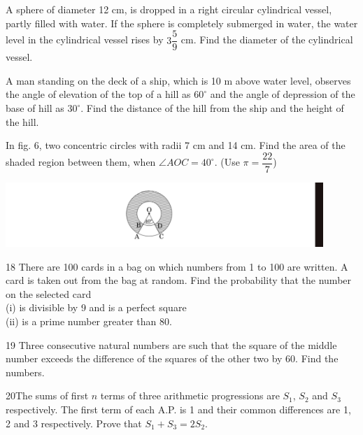 \documentclass[a4paper,12pt]{article}
\begin{document}
\begin{enumerate}
    \item A sphere of diameter 12 cm, is dropped in a right circular cylindrical vessel, partly filled with water. If the sphere is completely submerged in water, the water level in the cylindrical vessel rises by $3\dfrac{5}{9}$ cm. Find the diameter of the cylindrical vessel.

    \item A man standing on the deck of a ship, which is 10 m above water level, observes the angle of elevation of the top of a hill as $60^\circ$ and the angle of depression of the base of hill as $30^\circ$. Find the distance of the hill from the ship and the height of the hill.

    \item In fig. 6, two concentric circles with radii 7 cm and 14 cm. Find the area of the shaded region between them, when $\angle AOC = 40^\circ$. (Use $\pi = \dfrac{22}{7}$)

    \begin{center}
        \includegraphics[width=0.9\textwidth]{p2.png} %
        \\
\item{18} There are 100 cards in a bag on which numbers from 1 to 100 are written. A card is taken out from the bag at random. Find the probability that the number on the selected card\\
    (i) is divisible by 9 and is a perfect square\\
    (ii) is a prime number greater than 80.

    \item{19} Three consecutive natural numbers are such that the square of the middle number exceeds the difference of the squares of the other two by 60. Find the numbers.

    \item {20}The sums of first \(n\) terms of three arithmetic progressions are \(S_1\), \(S_2\) and \(S_3\) respectively. The first term of each A.P. is 1 and their common differences are 1, 2 and 3 respectively. Prove that \(S_1 + S_3 = 2S_2\).
    \end{center}
\end{enumerate}
\end{document}
